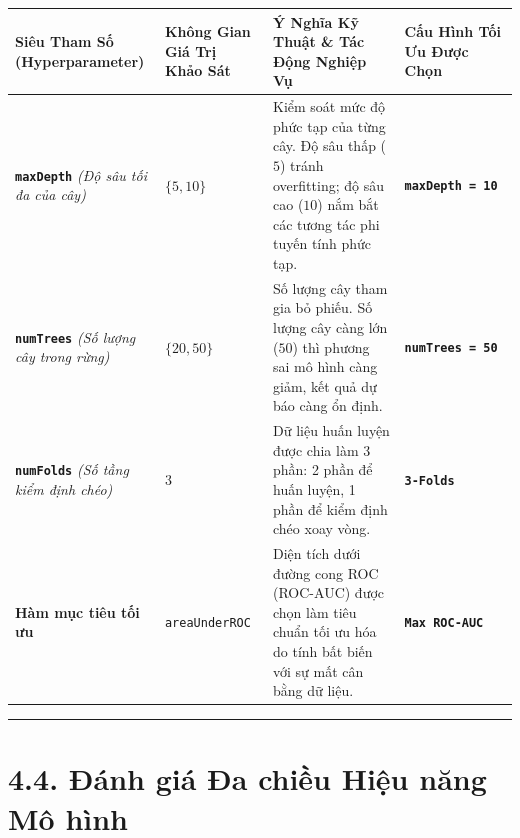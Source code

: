 \documentclass[
  13pt,
  a4paper,
]{report}
\newcounter{none} %
\begin{document}
{\def\LTcaptype{none} %
\begin{longtable}[]{@{}
  >{\raggedright\arraybackslash}p{}
  >{\centering\arraybackslash}p{}
  >{\raggedright\arraybackslash}p{}
  >{\centering\arraybackslash}p{}@{}}
\toprule\noalign{}
\begin{minipage}[b]{\linewidth}\raggedright
Siêu Tham Số (Hyperparameter)
\end{minipage} & \begin{minipage}[b]{\linewidth}\centering
Không Gian Giá Trị Khảo Sát
\end{minipage} & \begin{minipage}[b]{\linewidth}\raggedright
Ý Nghĩa Kỹ Thuật \& Tác Động Nghiệp Vụ
\end{minipage} & \begin{minipage}[b]{\linewidth}\centering
Cấu Hình Tối Ưu Được Chọn
\end{minipage} \\
\midrule\noalign{}
\endhead
\bottomrule\noalign{}
\endlastfoot
\textbf{\texttt{maxDepth}} \emph{(Độ sâu tối đa của cây)} &
\(\{5, 10\}\) & Kiểm soát mức độ phức tạp của từng cây. Độ sâu thấp
(\(5\)) tránh overfitting; độ sâu cao (\(10\)) nắm bắt các tương tác phi
tuyến tính phức tạp. & \textbf{\texttt{maxDepth\ =\ 10}} \\
\textbf{\texttt{numTrees}} \emph{(Số lượng cây trong rừng)} &
\(\{20, 50\}\) & Số lượng cây tham gia bỏ phiếu. Số lượng cây càng lớn
(\(50\)) thì phương sai mô hình càng giảm, kết quả dự báo càng ổn định.
& \textbf{\texttt{numTrees\ =\ 50}} \\
\textbf{\texttt{numFolds}} \emph{(Số tầng kiểm định chéo)} & \(3\) & Dữ
liệu huấn luyện được chia làm 3 phần: 2 phần để huấn luyện, 1 phần để
kiểm định chéo xoay vòng. & \textbf{\texttt{3-Folds}} \\
\textbf{Hàm mục tiêu tối ưu} & \texttt{areaUnderROC} & Diện tích dưới
đường cong ROC (ROC-AUC) được chọn làm tiêu chuẩn tối ưu hóa do tính bất
biến với sự mất cân bằng dữ liệu. & \textbf{\texttt{Max\ ROC-AUC}} \\
\end{longtable}
}

\begin{center}\rule{0.5\linewidth}{0.5pt}\end{center}

\section{4.4. Đánh giá Đa chiều Hiệu năng Mô
hình}\label{ux111uxe1nh-giuxe1-ux111a-chiux1ec1u-hiux1ec7u-nux103ng-muxf4-huxecnh}
\end{document}

